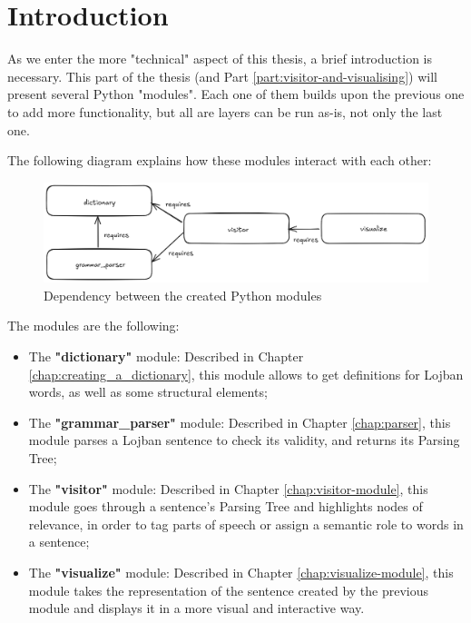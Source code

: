 \chapter{Introduction}

\vspace{0.5cm}

As we enter the more "technical" aspect of this thesis, a brief introduction is necessary. This part of the thesis
(and Part \ref{part:visitor-and-visualising}) will present several Python "modules". Each one of them builds upon the previous one to
add more functionality, but all are layers can be run as-is, not only the last one.\newline

The following diagram explains how these modules interact with each other:\newline

\begin{figure}[H]
\hspace{-1.5cm}
\includegraphics[scale=0.43]{images/module_dependency.png}
\caption{Dependency between the created Python modules}
\end{figure}

The modules are the following: \newline

\begin{itemize}
\item The \textbf{"dictionary"} module: Described in Chapter \ref{chap:creating_a_dictionary},
this module allows to get definitions for Lojban words, as well as some structural elements;
\item The \textbf{"grammar\_parser"} module: Described in Chapter \ref{chap:parser}, this module parses
a Lojban sentence to check its validity, and returns its Parsing Tree;
\item The \textbf{"visitor"} module: Described in Chapter \ref{chap:visitor-module}, this module goes through
a sentence's Parsing Tree and highlights nodes of relevance, in order to tag parts of speech or assign a semantic role
to words in a sentence;
\item The \textbf{"visualize"} module: Described in Chapter \ref{chap:visualize-module}, this module takes the
representation of the sentence created by the previous module and displays it in a more visual and interactive way.
\end{itemize}

